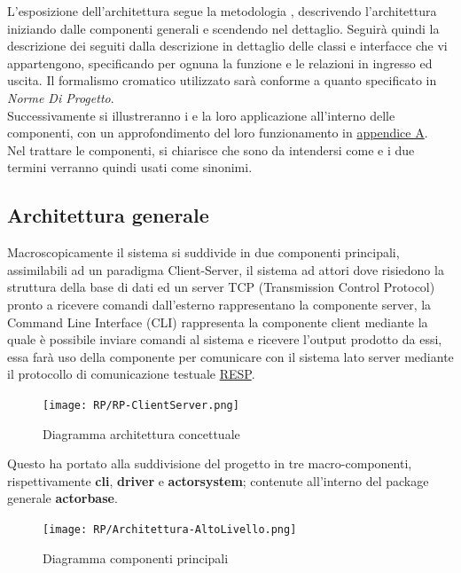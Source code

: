 \documentclass{scalatekids-article}
\begin{document}
L'esposizione dell'architettura segue la metodologia ,
descrivendo l'architettura iniziando dalle componenti generali e scendendo
nel dettaglio. Seguirà quindi la descrizione dei  seguiti dalla descrizione
in dettaglio delle classi e interfacce che vi appartengono, specificando
per ognuna la funzione e le relazioni in ingresso ed uscita. Il formalismo
cromatico utilizzato sarà conforme a quanto specificato in \textit{Norme Di Progetto}.\\
Successivamente si illustreranno i  e la loro applicazione
all'interno delle componenti, con un approfondimento del loro funzionamento
in \hyperref[sec:appendice]{appendice A}.\\
Nel trattare le componenti, si chiarisce che sono da intendersi come 
e i due termini verranno quindi usati come sinonimi.\\

\subsection{Architettura generale}

Macroscopicamente il sistema si suddivide in due componenti principali,
assimilabili ad un paradigma Client-Server, il sistema ad attori dove risiedono
la struttura della base di dati ed un server TCP (Transmission Control Protocol)
pronto a ricevere comandi dall'esterno rappresentano la componente server, la
Command Line Interface (CLI) rappresenta la componente client mediante la quale
è possibile inviare comandi al sistema e ricevere l'output prodotto da essi,
essa farà uso della componente  per comunicare con il sistema lato
server mediante il protocollo di comunicazione testuale \hyperref[sec:RESP]{RESP}.\\

\begin{figure}[H]
  \begin{center}
    \texttt{[image: RP/RP-ClientServer.png]}
    \caption{Diagramma architettura concettuale}
  \end{center}
\end{figure}

Questo ha portato alla suddivisione del progetto in tre macro-componenti, rispettivamente
\textbf{cli}, \textbf{driver} e \textbf{actorsystem}; contenute all'interno del package
generale \textbf{actorbase}.

\begin{figure}[H]
  \begin{center}
    \texttt{[image: RP/Architettura-AltoLivello.png]}
    \caption{Diagramma componenti principali}
  \end{center}
\end{figure}
\end{document}
